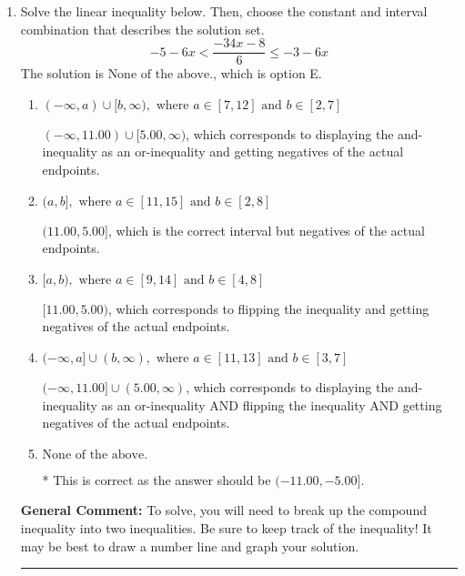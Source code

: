 \documentclass{extbook}[14pt]
\newcommand{\litem}[1]{\item #1

\rule{\textwidth}{0.4pt}}
\begin{document}
\begin{enumerate}
{\begin{enumerate}[label=\Alph*.]
Corresponds to including the endpoints AND negating.
\item \( (-\infty, a) \cup (b, \infty), \text{ where } a \in [-4, -2] \text{ and } b \in [-0.33, 3.67] \)

Corresponds to inverting the inequality and negating the solution.
\item \( (-\infty, a] \cup [b, \infty), \text{ where } a \in [-3.67, 2.33] \text{ and } b \in [2.4, 4.1] \)

Corresponds to including the endpoints (when they should be excluded).
\item \( (-\infty, a) \cup (b, \infty), \text{ where } a \in [-1.67, 1.33] \text{ and } b \in [4, 8] \)

 * Correct option.
\item \( (-\infty, \infty) \)

Corresponds to the variable canceling, which does not happen in this instance.
\end{enumerate}

\textbf{General Comment:} When multiplying or dividing by a negative, flip the sign.
}
\litem{
Solve the linear inequality below. Then, choose the constant and interval combination that describes the solution set.
\[ -5 - 6 x < \frac{-34 x - 8}{6} \leq -3 - 6 x \]
The solution is \( \text{None of the above.} \), which is option E.\begin{enumerate}[label=\Alph*.]
\item \( (-\infty, a) \cup [b, \infty), \text{ where } a \in [7, 12] \text{ and } b \in [2, 7] \)

$(-\infty, 11.00) \cup [5.00, \infty)$, which corresponds to displaying the and-inequality as an or-inequality and getting negatives of the actual endpoints.
\item \( (a, b], \text{ where } a \in [11, 15] \text{ and } b \in [2, 8] \)

$(11.00, 5.00]$, which is the correct interval but negatives of the actual endpoints.
\item \( [a, b), \text{ where } a \in [9, 14] \text{ and } b \in [4, 8] \)

$[11.00, 5.00)$, which corresponds to flipping the inequality and getting negatives of the actual endpoints.
\item \( (-\infty, a] \cup (b, \infty), \text{ where } a \in [11, 13] \text{ and } b \in [3, 7] \)

$(-\infty, 11.00] \cup (5.00, \infty)$, which corresponds to displaying the and-inequality as an or-inequality AND flipping the inequality AND getting negatives of the actual endpoints.
\item \( \text{None of the above.} \)

* This is correct as the answer should be $(-11.00, -5.00]$.
\end{enumerate}

\textbf{General Comment:} To solve, you will need to break up the compound inequality into two inequalities. Be sure to keep track of the inequality! It may be best to draw a number line and graph your solution.
}
\end{enumerate}
\end{document}
